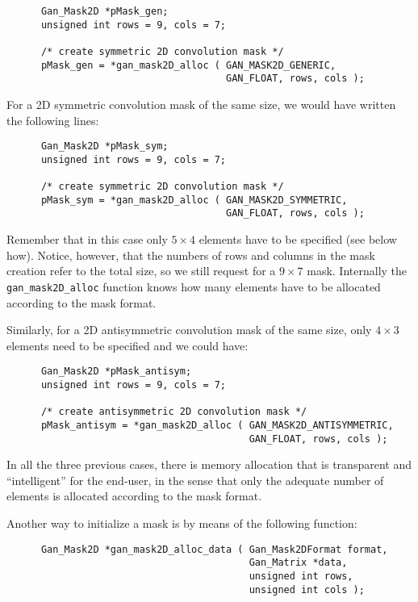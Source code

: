     \begin{verbatim}
      Gan_Mask2D *pMask_gen;
      unsigned int rows = 9, cols = 7;

      /* create symmetric 2D convolution mask */
      pMask_gen = *gan_mask2D_alloc ( GAN_MASK2D_GENERIC, 
                                      GAN_FLOAT, rows, cols );
    \end{verbatim}

    For a 2D symmetric convolution mask of the same size, we would have
    written the following lines:

    \begin{verbatim}
      Gan_Mask2D *pMask_sym;
      unsigned int rows = 9, cols = 7;

      /* create symmetric 2D convolution mask */
      pMask_sym = *gan_mask2D_alloc ( GAN_MASK2D_SYMMETRIC, 
                                      GAN_FLOAT, rows, cols );
    \end{verbatim}

    Remember that in this case only $5 \times 4$ elements have to be 
    specified (see below how). Notice, however, that the numbers of rows and 
    columns in the mask creation refer to the total size, so we still 
    request for a $9 \times 7$ 
    mask. Internally the \texttt{gan\_mask2D\_alloc} function knows how many
    elements have to be allocated according to the mask format.
  
    Similarly, for a 2D antisymmetric convolution mask of the same size, 
    only $4 \times 3$ elements need to be specified and we could have:

    \begin{verbatim}
      Gan_Mask2D *pMask_antisym;
      unsigned int rows = 9, cols = 7;

      /* create antisymmetric 2D convolution mask */
      pMask_antisym = *gan_mask2D_alloc ( GAN_MASK2D_ANTISYMMETRIC, 
                                          GAN_FLOAT, rows, cols );
    \end{verbatim}

    In all the three previous cases, there is memory allocation that is
    transparent and ``intelligent'' for the end-user, in the sense that
    only the adequate number of elements is allocated according to the
    mask format.

    Another way to initialize a mask is by means of the following function:

    \begin{verbatim}
      Gan_Mask2D *gan_mask2D_alloc_data ( Gan_Mask2DFormat format, 
                                          Gan_Matrix *data,  
                                          unsigned int rows,
                                          unsigned int cols );
    \end{verbatim}

